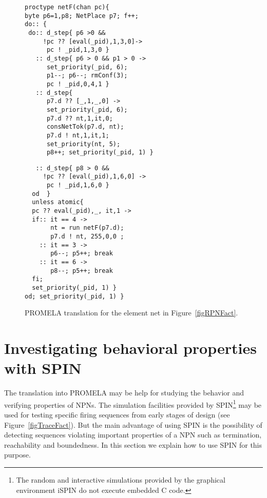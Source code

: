 \documentclass{llncs}
\begin{document}
\mfont
\begin{figure}[h]
\begin{multicols}{2}
\begin{minipage}[t]{0.5\textwidth}\begin{verbatim}
proctype netF(chan pc){
byte p6=1,p8; NetPlace p7; f++;
do:: {
 do:: d_step{ p6 >0 &&
     !pc ?? [eval(_pid),1,3,0]->
      pc ! _pid,1,3,0 }
   :: d_step{ p6 > 0 && p1 > 0 ->
      set_priority(_pid, 6);
      p1--; p6--; rmConf(3);
      pc ! _pid,0,4,1 }
   :: d_step{
      p7.d ?? [_,1,_,0] ->
      set_priority(_pid, 6);
      p7.d ?? nt,1,it,0;
      consNetTok(p7.d, nt);
      p7.d ! nt,1,it,1;
      set_priority(nt, 5);
      p8++; set_priority(_pid, 1) }
\end{verbatim}
\end{minipage}

\begin{minipage}[t]{0.5\textwidth}\begin{verbatim}
   :: d_step{ p8 > 0 &&
     !pc ?? [eval(_pid),1,6,0] ->
      pc ! _pid,1,6,0 }
  od  }
  unless atomic{
  pc ?? eval(_pid),_, it,1 ->
  if:: it == 4 ->
       nt = run netF(p7.d);
       p7.d ! nt, 255,0,0 ;
    :: it == 3 ->
       p6--; p5++; break
    :: it == 6 ->
       p8--; p5++; break
  fi;
  set_priority(_pid, 1) }
od; set_priority(_pid, 1) }
\end{verbatim}
\end{minipage}
\end{multicols}
\caption{PROMELA translation for the element net  in Figure~\ref{figRPNFact}.}
\label{figTransF}
\end{figure}
\nfont




\section{Investigating behavioral properties with SPIN}
\label{sec:prop}

The translation into PROMELA may be help for studying the behavior and verifying properties of NPNs. The simulation facilities provided by SPIN\footnote{The random and interactive simulations provided by the graphical environment iSPIN do not execute embedded C code.}  may be used for testing specific firing sequences from early stages of design (see Figure~\ref{figTraceFact}). But the main advantage of using SPIN is the possibility of detecting sequences violating important properties of a NPN such as termination, reachability and boundedness. In this section we explain how to use SPIN for this purpose.
\end{document}
